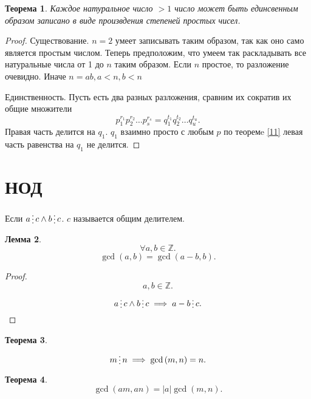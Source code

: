\documentclass{scrarticle}
\newtheorem{theorem}{Теорема}
\newtheorem{lemma}[theorem]{Лемма}
\newcommand{\divisible}{\mathop{\raisebox{-2pt}{\vdots}}}
\begin{document}
    \begin{theorem}
        Каждое натуральное число $> 1$ число может быть единсвенным образом записано в виде произвдения степеней простых чисел.
    \end{theorem}
    \begin{proof}

        Существование. $n = 2$ умеет записывать таким образом, так как оно само является простым числом. Теперь предположим, что умеем так раскладывать все натуральные числа от 1 до  $n$ таким образом. Если  $n$ простое, то разложение очевидно. Иначе $n = ab, a < n, b < n$

        Единственность. Пусть есть два разных разложения, сравним их сократив их общие множители
        \[
            p_1^{r_1}p_2^{r_2} \dots p_s^{r_s} = q_1^{t_1}q_2^{t_2} \dots q_u^{t_u}
        .\] 
        Правая часть делится на $q_1$. $q_1$ взаимно просто с любым $p$ по теоремe \ref{11} левая часть равенства на  $q_1$ не делится.
    \end{proof}
    \section{НОД}
    Если $a \divisible c \land b \divisible c$. $c$ называется общим делителем.
    \begin{lemma}
        \[
        \forall a , b \in \mathbb{Z}
        .\] 
        \[
            \gcd{( a,b )} = \gcd{( a-b,b )}
        .\] 
    \end{lemma}
    \begin{proof}
        \[
        a , b \in \mathbb{Z}
        .\] 
        \[
        a \divisible c \land b \divisible c \implies a - b \divisible c
        .\] 
    \end{proof}
    \begin{theorem}
        \[
            m \divisible n \implies \gcd{(m,n)} = n
        .\] 
    \end{theorem}
    \begin{theorem}
        \[
            \gcd{(am,an)} = |a| \gcd{( m,n )}
        .\] 
    \end{theorem}
\end{document}

